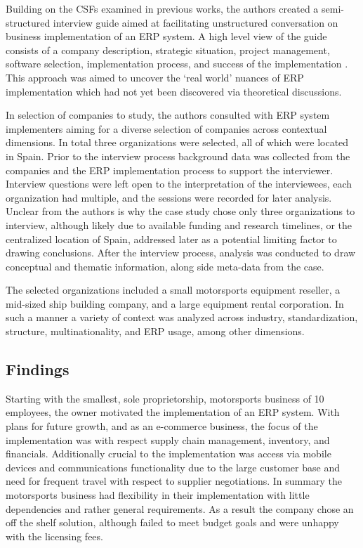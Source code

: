 \documentclass{article}
\begin{document}
Building on the CSFs examined in previous works, the authors created a semi-structured interview guide aimed at facilitating unstructured conversation on business implementation of an ERP system.
A high level view of the guide consists of a company description, strategic situation, project management, software selection, implementation process, and success of the implementation \cite{integrated_erp}.
This approach was aimed to uncover the `real world' nuances of ERP implementation which had not yet been discovered via theoretical discussions. 

In selection of companies to study, the authors consulted with ERP system implementers aiming for a diverse selection of companies across contextual dimensions. 
In total three organizations were selected, all of which were located in Spain. 
Prior to the interview process background data was collected from the companies and the ERP implementation process to support the interviewer. 
Interview questions were left open to the interpretation of the interviewees, each organization had multiple, and the sessions were recorded for later analysis. 
Unclear from the authors is why the case study chose only three organizations to interview, although likely due to available funding and research timelines, or the centralized location of Spain, addressed later as a potential limiting factor to drawing conclusions. 
After the interview process, analysis was conducted to draw conceptual and thematic information, along side meta-data from the case.  

The selected organizations included a small motorsports equipment reseller, a mid-sized ship building company, and a large equipment rental corporation. 
In such a manner a variety of context was analyzed across industry, standardization, structure, multinationality, and ERP usage, among other dimensions. 

\subsection{Findings}
Starting with the smallest, sole proprietorship, motorsports business of 10 employees, the owner motivated the implementation of an ERP system. 
With plans for future growth, and as an e-commerce business, the focus of the implementation was with respect supply chain management, inventory, and financials. 
Additionally crucial to the implementation was access via mobile devices and communications functionality due to the large customer base and need for frequent travel with respect to supplier negotiations. 
In summary the motorsports business had flexibility in their implementation with little dependencies and rather general requirements. 
As a result the company chose an off the shelf solution, although failed to meet budget goals and were unhappy with the licensing fees. 
\end{document}
